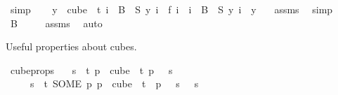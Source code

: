 \begin{isabellebody}
\ simp\isanewline
{}\isamarkupfalse%
\isanewline
\ \ \isamarkupfalse%
\ {\isachardoublequoteopen}{\isacharparenleft}{\kern0pt}{\isasymforall}y\ {\isasymin}\ cube\ {}\ t{\isachardot}{\kern0pt}\ {\isacharparenleft}{\kern0pt}{\isasymforall}i\ {\isasymin}\ B\ {}{\isachardot}{\kern0pt}\ S\ y\ i\ {\isacharequal}{\kern0pt}\ f\ i{\isacharparenright}{\kern0pt}\ {\isasymand}\ {\isacharparenleft}{\kern0pt}{\isasymforall}i\ {\isasymin}\ B\ {}{\isachardot}{\kern0pt}\ {\isacharparenleft}{\kern0pt}S\ y{\isacharparenright}{\kern0pt}\ i\ {\isacharequal}{\kern0pt}\ y\ {}{\isacharparenright}{\kern0pt}{\isacharparenright}{\kern0pt}{\isachardoublequoteclose}\ \isamarkupfalse%
\ assms{\isacharparenleft}{\kern0pt}{}{\isacharparenright}{\kern0pt}\ \isamarkupfalse%
\ simp\isanewline
{}\isamarkupfalse%
\isanewline
\ \ \isamarkupfalse%
\ {\isachardoublequoteopen}B\ {}\ {\isasymnoteq}\ {\isacharbraceleft}{\kern0pt}{\isacharbraceright}{\kern0pt}{\isachardoublequoteclose}\ \isamarkupfalse%
\ assms{\isacharparenleft}{\kern0pt}{}{\isacharparenright}{\kern0pt}\ \isamarkupfalse%
\ auto\isanewline
{}\isamarkupfalse%
%
\endisatagproof
{\isafoldproof}%
%
\isadelimproof
%
\endisadelimproof
%
\begin{isamarkuptext}%
Useful properties about cubes.%
\end{isamarkuptext}\isamarkuptrue%
\isamarkupfalse%
\ cube{\isacharunderscore}{\kern0pt}props{\isacharcolon}{\kern0pt}\isanewline
\ \ \ {\isachardoublequoteopen}{\isasymforall}s\ {\isasymin}\ {\isacharbraceleft}{\kern0pt}{\isachardot}{\kern0pt}{\isachardot}{\kern0pt}{\isacharless}{\kern0pt}t{\isacharbraceright}{\kern0pt}{\isachardot}{\kern0pt}\ {\isasymexists}p\ {\isasymin}\ cube\ {}\ t{\isachardot}{\kern0pt}\ p\ {}\ {\isacharequal}{\kern0pt}\ s{\isachardoublequoteclose}\isanewline
\ \ \ \ \ {\isachardoublequoteopen}{\isasymforall}s\ {\isasymin}\ {\isacharbraceleft}{\kern0pt}{\isachardot}{\kern0pt}{\isachardot}{\kern0pt}{\isacharless}{\kern0pt}t{\isacharbraceright}{\kern0pt}{\isachardot}{\kern0pt}\ {\isacharparenleft}{\kern0pt}SOME\ p{\isachardot}{\kern0pt}\ p\ {\isasymin}\ cube\ {}\ t\ {\isasymand}\ p\ {}\ {\isacharequal}{\kern0pt}\ s{\isacharparenright}{\kern0pt}\ {}\ {\isacharequal}{\kern0pt}\ s{\isachardoublequoteclose}\isanewline

\end{isabellebody}
